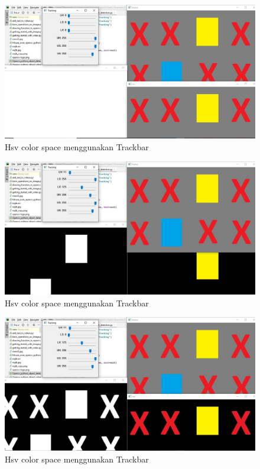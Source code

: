 \newpage
\begin{figure}[ht]
\centering
\includegraphics[scale=0.35]{figures/2,36.jpg}
\caption{Hsv color space menggunakan Trackbar}
\label{contoh}
\end{figure}

\begin{figure}[ht]
\centering
\includegraphics[scale=0.35]{figures/2,36,1.jpg}
\caption{Hsv color space menggunakan Trackbar}
\label{contoh}
\end{figure}

\newpage
\begin{figure}[ht]
\centering
\includegraphics[scale=0.35]{figures/2,36,2.jpg}
\caption{Hsv color space menggunakan Trackbar}
\label{contoh}
\end{figure}

